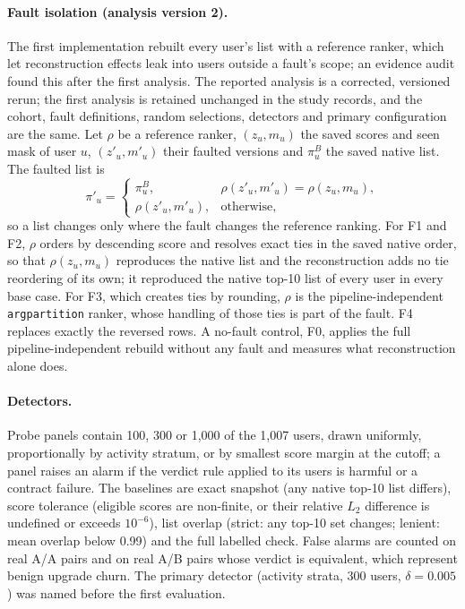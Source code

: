 \documentclass[11pt,a4paper]{article}
\begin{document}
\paragraph{Fault isolation (analysis version 2).} The first implementation
rebuilt every user's list with a reference ranker, which let reconstruction
effects leak into users outside a fault's scope; an evidence audit found this
after the first analysis. The reported analysis is a corrected, versioned
rerun; the first analysis is retained unchanged in the study records, and the
cohort, fault definitions, random selections, detectors and primary
configuration are the same. Let $\rho$ be a reference ranker,
$(z_u,m_u)$ the saved scores and seen mask of user $u$, $(z'_u,m'_u)$ their
faulted versions and $\pi^B_u$ the saved native list. The faulted list is
\begin{equation}
 \pi'_u=\begin{cases}
   \pi^B_u, & \rho(z'_u,m'_u)=\rho(z_u,m_u),\\
   \rho(z'_u,m'_u), & \text{otherwise,}
 \end{cases}
 \label{eq:isolation}
\end{equation}
so a list changes only where the fault changes the reference ranking. For F1
and F2, $\rho$ orders by descending score and resolves exact ties in the saved
native order, so that $\rho(z_u,m_u)$ reproduces the native list and the
reconstruction adds no tie reordering of its own; it reproduced the native
top-10 list of every user in every base case. For F3, which creates ties by
rounding, $\rho$ is the pipeline-independent \texttt{argpartition} ranker,
whose handling of those ties is part of the fault. F4 replaces exactly the
reversed rows. A no-fault control, F0, applies the full pipeline-independent
rebuild without any fault and measures what reconstruction alone does.

\paragraph{Detectors.} Probe panels contain 100, 300 or 1{,}000 of the 1{,}007
users, drawn uniformly, proportionally by activity stratum, or by smallest
score margin at the cutoff; a panel raises an alarm if the verdict rule applied
to its users is harmful or a contract failure. The baselines are exact snapshot
(any native top-10 list differs), score tolerance (eligible scores are
non-finite, or their relative $L_2$ difference is undefined or exceeds
$10^{-6}$), list overlap (strict: any top-10 set
changes; lenient: mean overlap below 0.99) and the full labelled check. False
alarms are counted on real A/A pairs and on real A/B pairs whose verdict is
equivalent, which represent benign upgrade churn. The primary detector
(activity strata, 300 users, $\delta=0.005$) was named before the first
evaluation.
\end{document}
